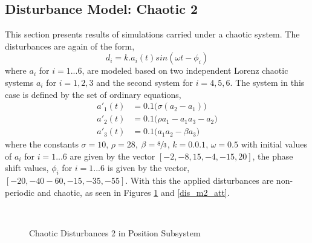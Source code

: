 \documentclass[letterpaper%
, twoside%
, 12pt%
,memoire%
, english%
,creativecommons,hyperref%
]{thETS}
\begin{document}
\subsection{Disturbance Model: Chaotic 2}
This section presents results of simulations carried under a chaotic system. The disturbances are again of the form,
\begin{equation}
d_i = k.a_i(t)sin(\omega t-\phi_i)
\label{eq:dist_2}
\end{equation}
where $a_i$ for $i=1...6$, are modeled based on two independent Lorenz chaotic systems $a_i$ for $i=1,2,3$ and the second system for $i=4,5,6$. The system in this case is defined by the set of ordinary equations, 
\begin{subequations}
\begin{align}
a'_1(t) &= 0.1\big(\sigma(a_2-a_1)\big)\\
a'_2(t) &= 0.1\big(\rho a_1 - a_1 a_3 - a_2\big)\\
a'_3(t) &= 0.1\big(a_1 a_2 - \beta a_3\big)
\end{align}
\end{subequations}
where the constants $\sigma=10$, $\rho=28$, $\beta=\sfrac{8}{3}$, $k=0.0.1$, $\omega=0.5$ with initial values of $a_i$ for $i=1...6$ are given by the vector $[-2,-8,15,-4,-15,20]$, the phase shift values, $\phi_i$ for $i=1...6$ is given by the vector, $[-20,-40-60,-15,-35,-55]$. With this the applied disturbances are non-periodic and chaotic, as seen in Figures \ref{dis_m2_pos} and \ref{dis_m2_att}.

\begin{figure}[H]
\centering
{}
\\ \parbox{0.75\textwidth}{\caption{Chaotic Disturbances 2 in Position Subsystem} \label{dis_m2_pos}}
\end{figure}
\end{document}

